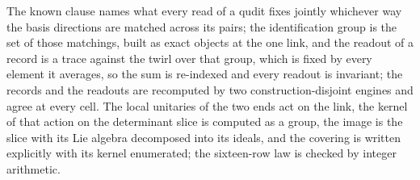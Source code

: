 The known clause names what every read of a qudit fixes jointly whichever way the basis directions are matched across its pairs; the identification group is the set of those matchings, built as exact objects at the one link, and the readout of a record is a trace against the twirl over that group, which is fixed by every element it averages, so the sum is re-indexed and every readout is invariant; the records and the readouts are recomputed by two construction-disjoint engines and agree at every cell. The local unitaries of the two ends act on the link, the kernel of that action on the determinant slice is computed as a group, the image is the slice with its Lie algebra decomposed into its ideals, and the covering is written explicitly with its kernel enumerated; the sixteen-row law is checked by integer arithmetic.

